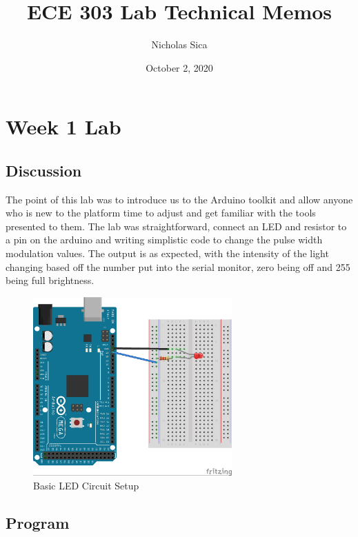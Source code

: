 \documentclass[12pt]{article}
\title{ECE 303 Lab Technical Memos}
\author{Nicholas Sica}
\date{October 2, 2020}
\begin{document}
    \maketitle
    \tableofcontents

    \section{Week 1 Lab}
        \subsection{Discussion}
            The point of this lab was to introduce us to the Arduino toolkit and allow anyone who is new to the platform time to adjust and get familiar with the tools presented to them. The lab was straightforward, connect an LED and resistor to a pin on the arduino and writing simplistic code to change the pulse width modulation values. The output is as expected, with the intensity of the light changing based off the number put into the serial monitor, zero being off and 255 being full brightness.
            \begin{figure}[!htb]
                \centering
                \includegraphics[width=3.0in]{figure_1_1.png}
                \caption{Basic LED Circuit Setup}
                \label{Circuit}
            \end{figure}
        \subsection{Program}
\end{document}
